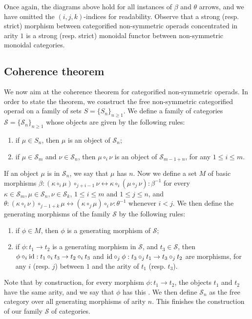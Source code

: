 Once again, the diagrams above hold for all instances of $\beta$ and $\theta$ arrows, and we have omitted the $(i,j,k)$-indices for readability. 
Observe that a strong (resp. strict) morphism between categorified non-symmetric operads concentrated in arity $1$ is a strong (resp. strict) monoidal functor between non-symmetric monoidal categories. 


\subsection{Coherence theorem}

We now aim at the coherence theorem for categorified non-symmetric operads.
In order to state the theorem, we construct the free non-symmetric categorified operad on a family of sets $S=\{S_n\}_{n \geq 1}$.
We define a family of categories $\mathcal{S}=\{\mathcal{S}_n\}_{n \geq 1}$ whose objects are given by the following rules:
\begin{enumerate}
    \item if $\mu \in S_n$, then $\mu$ is an object of $\mathcal{S}_n$;
    \item if $\mu \in \mathcal{S}_m$ and $\nu \in \mathcal{S}_n$, then $\mu \circ_i \nu$ is an object of $\mathcal{S}_{m-1+n}$, for any $1 \leq i \leq m$.
\end{enumerate}
If an object $\mu$ is in $\mathcal{S}_n$, we say that $\mu$ has  $n$. 
Now we define a set $M$ of basic morphisms $\beta: (\kappa \circ_i \mu) \circ_{j+i-1} \nu \leftrightarrow \kappa \circ_i (\mu \circ_j \nu) : \beta^{-1}$ for every $\kappa \in \mathcal{S}_m, \mu \in \mathcal{S}_n, \nu \in \mathcal{S}_k$, $1 \leq i \leq m$ and $1 \leq j \leq n$, and $\theta: (\kappa \circ_i \nu) \circ_{j-1+k} \mu \leftrightarrow (\kappa \circ_j \mu) \circ_i \nu : \theta^{-1}$ whenever $i<j$.
We then define the generating morphisms of the family $\mathcal{S}$ by the following rules:
\begin{enumerate}
    \item if $\phi \in M$, then $\phi$ is a generating morphism of $\mathcal{S}$; 
    \item if $\phi : t_1 \to t_2$ is a generating morphism in $\mathcal{S}$, and $t_3 \in \mathcal{S}$, then $\phi \circ_i \mathrm{id} : t_1 \circ_i t_3 \to t_2 \circ_i t_3$ and $\mathrm{id} \circ_j \phi : t_3 \circ_j t_1 \to t_3 \circ_j t_2$ are morphisms, for any $i$ (resp. $j$) between $1$ and the arity of $t_1$ (resp. $t_3$).
\end{enumerate}
Note that by construction, for every morphism $\phi : t_1 \to t_2$, the objects $t_1$ and $t_2$ have the same arity, and we say that $\phi$ has this . 
We then define $\mathcal{S}_n$ as the free category over all generating morphisms of arity $n$. 
This finishes the construction of our family $\mathcal{S}$ of categories.

